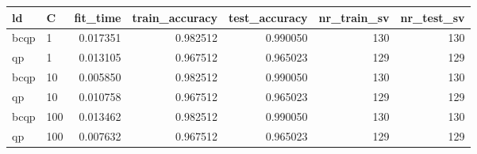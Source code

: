 \begin{tabular}{llrrrrr}
\toprule
  ld &   C &  fit\_time &  train\_accuracy &  test\_accuracy &  nr\_train\_sv &  nr\_test\_sv \\
\midrule
bcqp &   1 &  0.017351 &        0.982512 &       0.990050 &          130 &         130 \\
  qp &   1 &  0.013105 &        0.967512 &       0.965023 &          129 &         129 \\
bcqp &  10 &  0.005850 &        0.982512 &       0.990050 &          130 &         130 \\
  qp &  10 &  0.010758 &        0.967512 &       0.965023 &          129 &         129 \\
bcqp & 100 &  0.013462 &        0.982512 &       0.990050 &          130 &         130 \\
  qp & 100 &  0.007632 &        0.967512 &       0.965023 &          129 &         129 \\
\bottomrule
\end{tabular}
